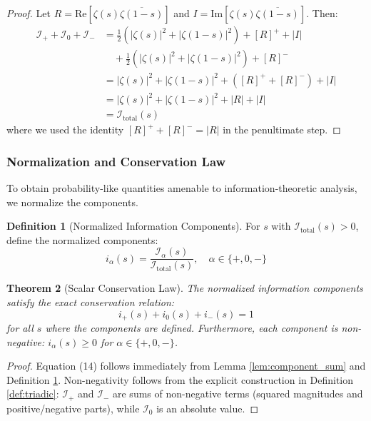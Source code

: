 \documentclass[12pt]{article}
\theoremstyle{plain}
\newtheorem{theorem}{Theorem}[section]
\theoremstyle{definition}
\newtheorem{definition}[theorem]{Definition}
\begin{document}
\begin{proof}
Let $R = \text{Re}[\zeta(s)\overline{\zeta(1-s)}]$ and $I = \text{Im}[\zeta(s)\overline{\zeta(1-s)}]$. Then:
\begin{align*}
\mathcal{I}_+ + \mathcal{I}_0 + \mathcal{I}_- &= \frac{1}{2}(|\zeta(s)|^2 + |\zeta(1-s)|^2) + [R]^+ + |I| \\
&\quad + \frac{1}{2}(|\zeta(s)|^2 + |\zeta(1-s)|^2) + [R]^- \\
&= |\zeta(s)|^2 + |\zeta(1-s)|^2 + ([R]^+ + [R]^-) + |I| \\
&= |\zeta(s)|^2 + |\zeta(1-s)|^2 + |R| + |I| \\
&= \mathcal{I}_{\text{total}}(s)
\end{align*}
where we used the identity $[R]^+ + [R]^- = |R|$ in the penultimate step.
\end{proof}

\subsubsection{Normalization and Conservation Law}

To obtain probability-like quantities amenable to information-theoretic analysis, we normalize the components.

\begin{definition}[Normalized Information Components]\label{def:normalized}
For $s$ with $\mathcal{I}_{\text{total}}(s) > 0$, define the normalized components:
\begin{equation}
i_\alpha(s) = \frac{\mathcal{I}_\alpha(s)}{\mathcal{I}_{\text{total}}(s)}, \quad \alpha \in \{+, 0, -\}
\end{equation}
\end{definition}

\begin{theorem}[Scalar Conservation Law]\label{thm:scalar_conservation}
The normalized information components satisfy the exact conservation relation:
\begin{equation}
i_+(s) + i_0(s) + i_-(s) = 1
\end{equation}
for all $s$ where the components are defined. Furthermore, each component is non-negative: $i_\alpha(s) \geq 0$ for $\alpha \in \{+, 0, -\}$.
\end{theorem}

\begin{proof}
Equation (14) follows immediately from Lemma \ref{lem:component_sum} and Definition \ref{def:normalized}. Non-negativity follows from the explicit construction in Definition \ref{def:triadic}: $\mathcal{I}_+$ and $\mathcal{I}_-$ are sums of non-negative terms (squared magnitudes and positive/negative parts), while $\mathcal{I}_0$ is an absolute value.
\end{proof}
\end{document}
